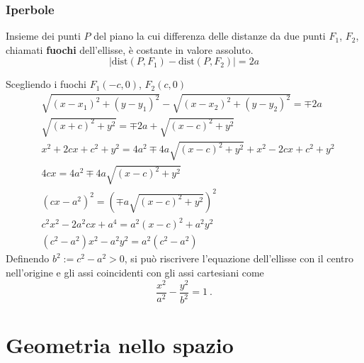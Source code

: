 \subsubsection{Iperbole}
\begin{definition}[Iperbole] Insieme dei punti $P$ del piano la cui differenza delle distanze da due punti $F_1$, $F_2$, chiamati \textbf{fuochi} dell'ellisse, è costante in valore assoluto.
    \begin{equation}
       | \text{dist}(P, F_1) - \text{dist}(P, F_2) | = 2a
    \end{equation}
\end{definition}
Scegliendo i fuochi $F_1(-c,0)$, $F_2(c,0)$
\begin{equation}
\begin{aligned}
    & \sqrt{( x - x_1 )^2 + (y-y_1)^2} - \sqrt{(x-x_2)^2 + (y-y_2)^2} = \mp 2a \\
    & \sqrt{( x + c )^2 + y^2} = \mp 2a + \sqrt{(x-c)^2 + y^2} \\
    & x^2 + 2 c x + c^2 + y^2  = 4a^2 \mp 4 a \sqrt{(x-c)^2 + y^2} +
    x^2 - 2 c x + c^2 + y^2 \\
    & 4c x = 4a^2 \mp 4a  \sqrt{(x-c)^2 + y^2} \\
    & (cx - a^2)^2 = ( \mp a  \sqrt{(x-c)^2 + y^2})^2 \\
    & c^2x^2 - 2a^2cx + a^4 = a^2(x-c)^2 + a^2 y^2 \\
    & (c^2-a^2) x^2 - a^2y^2 = a^2 (c^2-a^2) 
\end{aligned}
\end{equation}
Definendo $b^2 := c^2 - a^2 > 0$, si può riscrivere l'equazione dell'ellisse con il centro nell'origine e gli assi coincidenti con gli assi cartesiani come
\begin{equation}
  \dfrac{x^2}{a^2} - \dfrac{y^2}{b^2} = 1 \ .
\end{equation}

\section{Geometria nello spazio}


